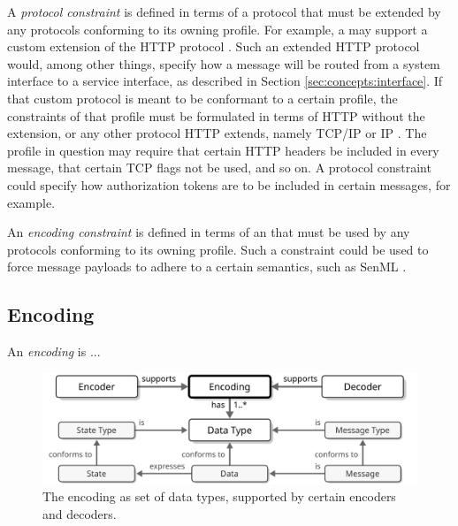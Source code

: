 A \textit{protocol constraint} is defined in terms of a protocol that must be extended by any protocols conforming to its owning profile. 
For example, a  may support a custom extension of the HTTP protocol \cite{fielding2014hypertext}.
Such an extended HTTP protocol would, among other things, specify how a message will be routed from a system interface to a service interface, as described in Section \ref{sec:concepts:interface}.
If that custom protocol is meant to be conformant to a certain profile, the constraints of that profile must be formulated in terms of HTTP without the extension, or any other protocol HTTP extends, namely TCP/IP \cite{postel1981transmission} or IP \cite{deering2017internet}.
The profile in question may require that certain HTTP headers be included in every message, that certain TCP flags not be used, and so on.
A protocol constraint could specify how authorization tokens are to be included in certain messages, for example.

An \textit{encoding constraint} is defined in terms of an  that must be used by any protocols conforming to its owning profile.
Such a constraint could be used to force message payloads to adhere to a certain semantics, such as SenML \cite{rfc8428}.

\subsection{Encoding}
\label{sec:concepts:encoding}

An \textit{encoding} is ...



\begin{figure}[ht!]
  \centering
  \includegraphics[scale=0.9]{figures/encoding}
  \caption{
    The encoding as set of data types, supported by certain encoders and decoders.
  }
  \label{fig:encoding}
\end{figure}